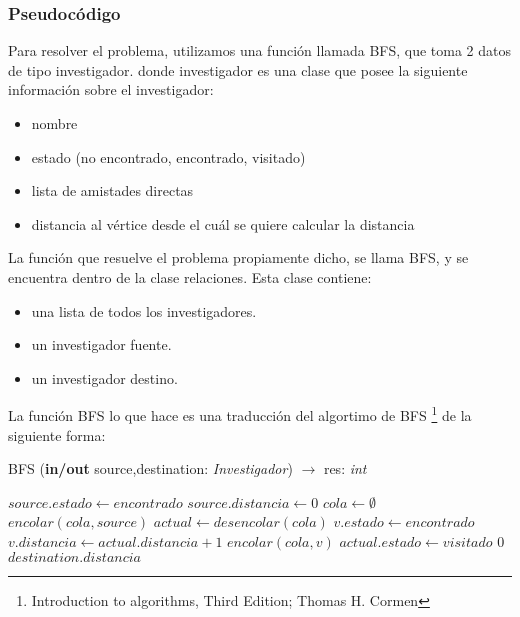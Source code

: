 \subsubsection{Pseudocódigo}

\indent Para resolver el problema, utilizamos una función  llamada BFS, que toma
2 datos de tipo investigador. donde investigador es una clase que posee la
siguiente información sobre el investigador:
\begin{itemize}
	\item nombre
	\item estado (no encontrado, encontrado, visitado)
	\item lista de amistades directas
	\item distancia al vértice desde el cuál se quiere calcular la distancia
\end{itemize}
\indent La función que resuelve el problema propiamente dicho, se llama BFS, y
se encuentra dentro de la clase relaciones. Esta clase contiene:

\begin{itemize}
\item una lista de todos los investigadores.
\item un investigador fuente.
\item un investigador destino.
\end{itemize}
\indent La función BFS lo que hace es una traducción del algortimo de BFS
\footnote{Introduction to algorithms, Third Edition; Thomas H. Cormen}  de la
siguiente forma:\\

\begin{algorithm}
\caption{BFS (\textbf{in/out} source,destination: \textsl{Investigador}) $\rightarrow$ res: \textsl{int}}
\begin{algorithmic}[1]

\STATE $source.estado \leftarrow encontrado$
\STATE $source.distancia \leftarrow 0$
\STATE $cola \leftarrow \emptyset$
\STATE $encolar(cola,source)$
	\STATE $actual \leftarrow desencolar(cola)$
			\STATE $v.estado \leftarrow encontrado$
			\STATE $v.distancia \leftarrow actual.distancia + 1$
			\STATE $encolar(cola,v)$
		\ENDIF
	\ENDFOR
	\STATE $actual.estado \leftarrow visitado$
\ENDWHILE
{}
	\RETURN $0$
\ELSE
	\RETURN $destination.distancia$
\ENDIF
\end{algorithmic}
\end{algorithm}

